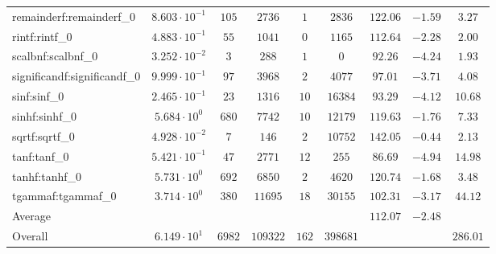 \begin{tabular}{|l|c|c|c|c|c|c|c|c|}
remainderf:remainderf\_0     & $ 8.603 \cdot 10^{-1} $ & $ 105    $ & $ 2736   $ & $ 1   $ & $ 2836   $ & $ 122.06      $ & $ -1.59   $ & $ 3.27    $ \\
rintf:rintf\_0               & $ 4.883 \cdot 10^{-1} $ & $ 55     $ & $ 1041   $ & $ 0   $ & $ 1165   $ & $ 112.64      $ & $ -2.28   $ & $ 2.00    $ \\
scalbnf:scalbnf\_0           & $ 3.252 \cdot 10^{-2} $ & $ 3      $ & $ 288    $ & $ 1   $ & $ 0      $ & $ 92.26       $ & $ -4.24   $ & $ 1.93    $ \\
significandf:significandf\_0 & $ 9.999 \cdot 10^{-1} $ & $ 97     $ & $ 3968   $ & $ 2   $ & $ 4077   $ & $ 97.01       $ & $ -3.71   $ & $ 4.08    $ \\
sinf:sinf\_0                 & $ 2.465 \cdot 10^{-1} $ & $ 23     $ & $ 1316   $ & $ 10  $ & $ 16384  $ & $ 93.29       $ & $ -4.12   $ & $ 10.68   $ \\
sinhf:sinhf\_0               & $ 5.684 \cdot 10^{0}  $ & $ 680    $ & $ 7742   $ & $ 10  $ & $ 12179  $ & $ 119.63      $ & $ -1.76   $ & $ 7.33    $ \\
sqrtf:sqrtf\_0               & $ 4.928 \cdot 10^{-2} $ & $ 7      $ & $ 146    $ & $ 2   $ & $ 10752  $ & $ 142.05      $ & $ -0.44   $ & $ 2.13    $ \\
tanf:tanf\_0                 & $ 5.421 \cdot 10^{-1} $ & $ 47     $ & $ 2771   $ & $ 12  $ & $ 255    $ & $ 86.69       $ & $ -4.94   $ & $ 14.98   $ \\
tanhf:tanhf\_0               & $ 5.731 \cdot 10^{0}  $ & $ 692    $ & $ 6850   $ & $ 2   $ & $ 4620   $ & $ 120.74      $ & $ -1.68   $ & $ 3.48    $ \\
tgammaf:tgammaf\_0           & $ 3.714 \cdot 10^{0}  $ & $ 380    $ & $ 11695  $ & $ 18  $ & $ 30155  $ & $ 102.31      $ & $ -3.17   $ & $ 44.12   $ \\
\hline
Average                      & $                     $ & $        $ & $        $ & $     $ & $        $ & $ 112.07      $ & $ -2.48   $ & $         $ \\
\hline
Overall                      & $ 6.149 \cdot 10^{1}  $ & $ 6982   $ & $ 109322 $ & $ 162 $ & $ 398681 $ & $             $ & $         $ & $ 286.01  $ \\
\hline
\end{tabular}
